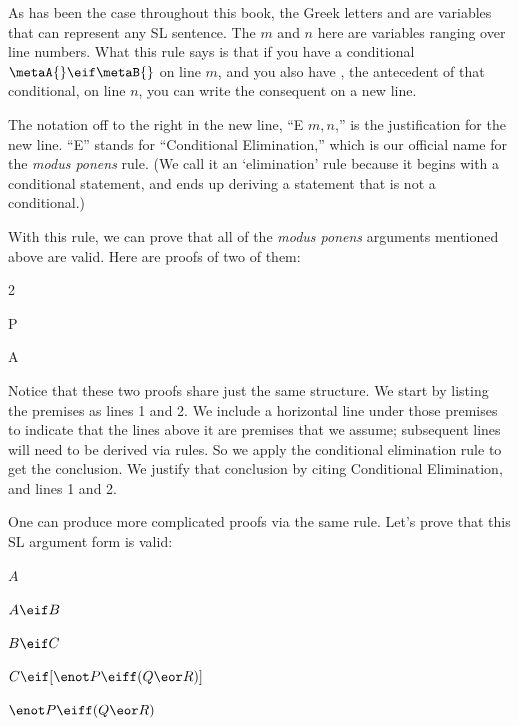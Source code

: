 \begin{ndproof}
	\metaA{}
	\metaB{} 
\end{ndproof}

As has been the case throughout this book, the Greek letters \metaA{} and \metaB{} are variables that can represent any SL sentence. The $m$ and $n$ here are variables ranging over line numbers. What this rule says is that if you have a conditional $\metaA{}\eif\metaB{}$ on line $m$, and you also have \metaA{}, the antecedent of that conditional, on line $n$, you can write the consequent \metaB{} on a new line.

The notation off to the right in the new line, ``\eif E $m, n$,'' is the justification for the new line. ``\eif E'' stands for ``Conditional Elimination,'' which is our official name for the \emph{modus ponens} rule. (We call it an `elimination' rule because it begins with a conditional statement, and ends up deriving a statement that is not a conditional.)

With this rule, we can prove that all of the \emph{modus ponens} arguments mentioned above are valid. Here are proofs of two of them:


\begin{multicols}{2}

\begin{ndproof}
	P
	 
\end{ndproof}


\begin{ndproof}
	A 
\end{ndproof}

\end{multicols}

Notice that these two proofs share just the same structure. We start by listing the premises as lines 1 and 2. We include a horizontal line under those premises to indicate that the lines above it are premises that we assume; subsequent lines will need to be derived via rules. So we apply the conditional elimination rule to get the conclusion. We justify that conclusion by citing Conditional Elimination, and lines 1 and 2.

One can produce more complicated proofs via the same rule. Let's prove that this SL argument form is valid:

\begin{earg}

\item[] $A$
\item[] $A \eif B$
\item[] $B \eif C$
\item[] $C \eif [\enot P \eiff (Q \eor R)]$
\item[\therefore] $\enot P \eiff (Q \eor R)$
\end{earg}

